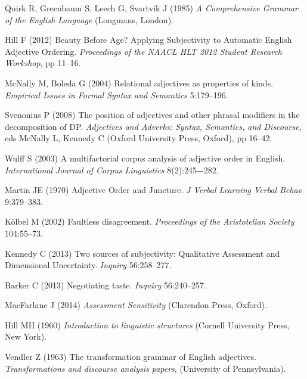 \documentclass{pnastwo}
\begin{document}
\begin{article}
\begin{thebibliography}{10}
	
	
	Quirk R, Greenbaum S, Leech G, Svartvik J (1985) \emph{A Comprehensive Grammar of the English Language} (Longmans, London).
	
	Hill F (2012) Beauty Before Age? Applying Subjectivity to Automatic English Adjective Ordering. \emph{Proceedings of the NAACL HLT 2012 Student Research Workshop}, pp 11--16.	
	
	McNally M, Boleda G (2004) Relational adjectives as properties of kinds. \emph{Empirical Issues in Formal Syntax and Semantics} 5:179--196.
	
	Svenonius P (2008) The position of adjectives and other phrasal modifiers in the decomposition of DP. \emph{Adjectives and Adverbs: Syntax, Semantics, and Discourse}, eds McNally L, Kennedy C (Oxford University Press, Oxford), pp 16--42.
		
	Wulff S (2003) A multifactorial corpus analysis of adjective order in English. \emph{International Journal of Corpus Linguistics} 8(2):245‒-282.
	
	Martin JE (1970) Adjective Order and Juncture. \emph{J Verbal Learning Verbal Behav} 9:379--383. 
	
	K\"{o}lbel M (2002) Faultless disagreement. \emph{Proceedings of the Aristotelian Society} 104:55--73.
	
	Kennedy C (2013) Two sources of subjectivity: Qualitative Assessment and Dimensional Uncertainty. \emph{Inquiry} 56:258--277.
	
	Barker C (2013) Negotiating taste. \emph{Inquiry} 56:240--257.
	
	MacFarlane J (2014) \emph{Assessment Sensitivity} (Clarendon Press, Oxford).
	
	Hill MH (1960) \emph{Introduction to linguistic structures} (Cornell University Press, New York).
	
	Vendler Z (1963) The transformation grammar of English adjectives. \emph{Transformations and discourse analysis papers}, (University of Pennsylvania).
	

\end{thebibliography}
\end{article}
\end{document}
